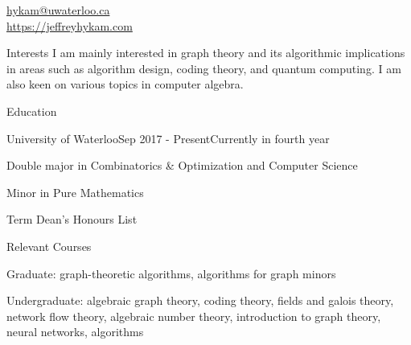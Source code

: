 \documentclass{cv}
\begin{document}

\href{hykam@uwaterloo.ca}{hykam@uwaterloo.ca} \\
\href{https://jeffreyhykam.com}{https://jeffreyhykam.com}

\begin{rSection}{Interests}
	I am mainly interested in graph theory and its algorithmic implications in areas such as 
	algorithm design, coding theory, and quantum computing. I am also keen on various topics in computer algebra.
\end{rSection}

\begin{rSection}{Education}
\begin{rSubsection}{University of Waterloo}{Sep 2017 - Present}{Currently in fourth year}{}
	\item Double major in Combinatorics \& Optimization and Computer Science
	\item Minor in Pure Mathematics
	\item Term Dean's Honours List
\end{rSubsection}

\begin{rSubsection}{Relevant Courses}{}{}{}
	\item Graduate: graph-theoretic algorithms, algorithms for graph minors
	\item Undergraduate: algebraic graph theory, coding theory, fields and galois theory, network flow theory, 
	algebraic number theory, introduction to graph theory, neural networks, algorithms
\end{rSubsection}
\end{rSection}
\end{document}
